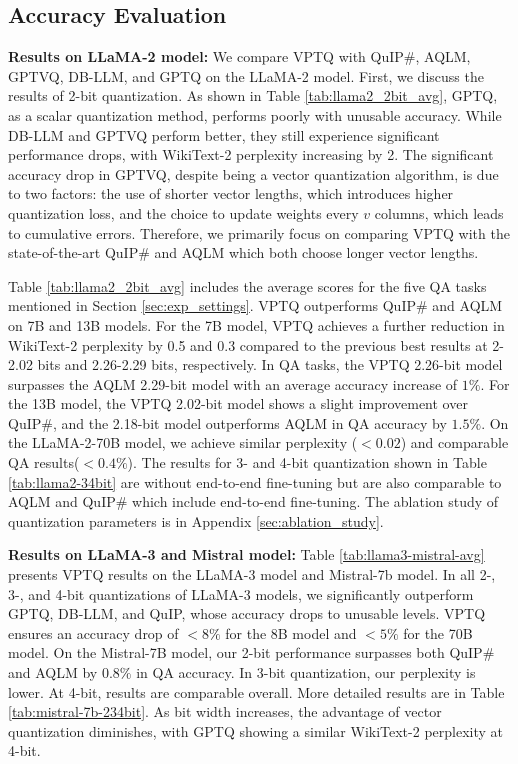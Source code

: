 \subsection{Accuracy Evaluation}
\vspace{-0.05in}
\textbf{Results on LLaMA-2 model:} 
We compare VPTQ with QuIP\#, AQLM, GPTVQ, DB-LLM, and GPTQ on the LLaMA-2 model. 
First, we discuss the results of 2-bit quantization. As shown in Table \ref{tab:llama2_2bit_avg}, GPTQ, as a scalar quantization method, performs poorly with unusable accuracy. 
While DB-LLM and GPTVQ perform better, they still experience significant performance drops, with WikiText-2 perplexity increasing by 2.  The significant accuracy drop in GPTVQ, despite being a vector quantization algorithm, is due to two factors: the use of shorter vector lengths, which introduces higher quantization loss, and the choice to update weights every $v$ columns, which leads to cumulative errors. Therefore, we primarily focus on comparing VPTQ with the state-of-the-art QuIP\# and AQLM which both choose longer vector lengths. 

Table \ref{tab:llama2_2bit_avg} includes the average scores for the five QA tasks mentioned in Section \ref{sec:exp_settings}.
VPTQ outperforms QuIP\# and AQLM on 7B and 13B models. 
For the 7B model, VPTQ achieves a further reduction in WikiText-2 perplexity by 0.5 and 0.3 compared to the previous best results %
at 2-2.02 bits and 2.26-2.29 bits, respectively. In QA tasks, the VPTQ 2.26-bit model surpasses the AQLM 2.29-bit model with an average accuracy increase of $1\%$. For the 13B model, the VPTQ 2.02-bit model shows a slight improvement over QuIP\#, and the 2.18-bit model outperforms AQLM in QA accuracy by $1.5\%$.
On the LLaMA-2-70B model, we achieve similar perplexity ($<0.02$) and comparable QA results($<0.4\%$). The results for 3- and 4-bit quantization shown in Table \ref{tab:llama2-34bit} are without end-to-end fine-tuning but are also comparable to AQLM and QuIP\# which include end-to-end fine-tuning. The ablation study of quantization parameters is in Appendix \ref{sec:ablation_study}. 

\textbf{Results on LLaMA-3 and Mistral model:} 
Table \ref{tab:llama3-mistral-avg} presents VPTQ results on the LLaMA-3 model and Mistral-7b model. 
In all 2-, 3-, and 4-bit quantizations of LLaMA-3 models, we significantly outperform GPTQ, DB-LLM, and QuIP, whose accuracy drops to unusable levels. VPTQ ensures an accuracy drop of $<8\%$ for the 8B model and $<5\%$ for the 70B model. 
On the Mistral-7B model, our 2-bit performance surpasses both QuIP\# and AQLM by $0.8\%$ in QA accuracy. In 3-bit quantization, our perplexity is lower. 
At 4-bit, results are comparable overall. More detailed results are in Table \ref{tab:mistral-7b-234bit}. As bit width increases, the advantage of vector quantization diminishes, with GPTQ showing a similar WikiText-2 perplexity at 4-bit.


